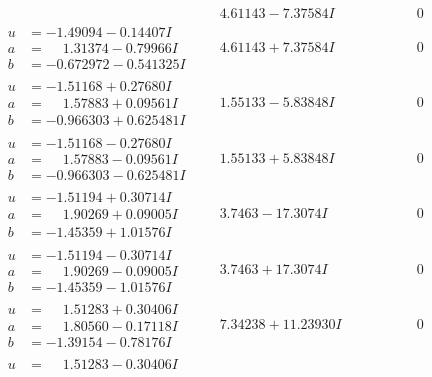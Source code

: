 \documentclass[1p]{elsarticle_modified}
\theoremstyle{definition}
\begin{document}
$$\begin{array}{c|c|c}
 & \phantom{-}4.61143 - 7.37584 I & \phantom{-0.000000 } 0 \\ \hline\begin{aligned}
u &= -1.49094 - 0.14407 I \\
a &= \phantom{-}1.31374 - 0.79966 I \\
b &= -0.672972 - 0.541325 I\end{aligned}
 & \phantom{-}4.61143 + 7.37584 I & \phantom{-0.000000 } 0 \\ \hline\begin{aligned}
u &= -1.51168 + 0.27680 I \\
a &= \phantom{-}1.57883 + 0.09561 I \\
b &= -0.966303 + 0.625481 I\end{aligned}
 & \phantom{-}1.55133 - 5.83848 I & \phantom{-0.000000 } 0 \\ \hline\begin{aligned}
u &= -1.51168 - 0.27680 I \\
a &= \phantom{-}1.57883 - 0.09561 I \\
b &= -0.966303 - 0.625481 I\end{aligned}
 & \phantom{-}1.55133 + 5.83848 I & \phantom{-0.000000 } 0 \\ \hline\begin{aligned}
u &= -1.51194 + 0.30714 I \\
a &= \phantom{-}1.90269 + 0.09005 I \\
b &= -1.45359 + 1.01576 I\end{aligned}
 & \phantom{-}3.7463 - 17.3074 I & \phantom{-0.000000 } 0 \\ \hline\begin{aligned}
u &= -1.51194 - 0.30714 I \\
a &= \phantom{-}1.90269 - 0.09005 I \\
b &= -1.45359 - 1.01576 I\end{aligned}
 & \phantom{-}3.7463 + 17.3074 I & \phantom{-0.000000 } 0 \\ \hline\begin{aligned}
u &= \phantom{-}1.51283 + 0.30406 I \\
a &= \phantom{-}1.80560 - 0.17118 I \\
b &= -1.39154 - 0.78176 I\end{aligned}
 & \phantom{-}7.34238 + 11.23930 I & \phantom{-0.000000 } 0 \\ \hline\begin{aligned}
u &= \phantom{-}1.51283 - 0.30406 I \\

\end{aligned}
\end{array}$$
\end{document}
